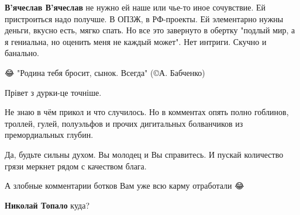 \begin{itemize}
\begin{itemize}
 
\textbf{В'ячеслав В'ячеслав} не нужно ей наше или чье-то иное сочувствие. Ей
пристроиться надо получше. В ОПЗЖ, в РФ-проекты. Ей элементарно нужны деньги,
вкусно есть, мягко спать. Но все это завернуто в обертку "подлый мир, а я
гениальна, но оценить меня не каждый может". Нет интриги. Скучно и банально.

\end{itemize}

 
😂
"Родина тебя бросит, сынок. Всегда"
(©А. Бабченко)

 
Прівет з дурки-це точніше.


Не знаю в чём прикол и что случилось. Но в комментах опять полно гоблинов,
троллей, гулей, полуэльфов и прочих дигитальных болванчиков из премордиальных
глубин.

Да, будьте сильны духом. Вы молодец и Вы справитесь. И пускай количество грязи
меркнет рядом с качеством блага.

А злобные комментарии ботков Вам уже всю карму отработали 😂

\begin{itemize}
 
\textbf{Николай Топало} куда?

 

\end{itemize}
\end{itemize}
